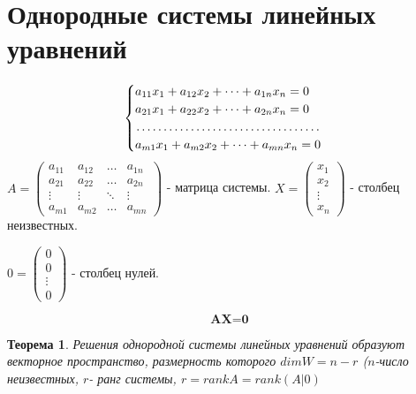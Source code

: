 \documentclass[a4paper, 12pt]{report}
\newtheorem*{theorem}{Теорема}
\begin{document}
\section{Однородные системы линейных уравнений}
\begin{equation}
    \begin{cases}
    $$a_{11}x_1+a_{12}x_2+\dots+a_{1n}x_n=0$$\\
    $$a_{21}x_1+a_{22}x_2+\dots+a_{2n}x_n=0$$\\
    \dotfill\\
    $$a_{m1}x_1+a_{m2}x_2+\dots+a_{mn}x_n=0$$
    \end{cases}
\end{equation}
 $A=
\begin{pmatrix}
a_{11} & a_{12} & \dots & a_{1n}\\
a_{21} & a_{22} & \dots & a_{2n}\\
\vdots & \vdots & \ddots & \vdots\\
a_{m1} & a_{m2} & \dots & a_{mn}
\end{pmatrix}$ - матрица системы.
$X=
\begin{pmatrix}
x_1\\
x_2\\
\vdots\\
x_n
\end{pmatrix}
$ - столбец неизвестных.\\
\begin{center}
$0=
\begin{pmatrix}
0\\
0\\
\vdots\\
0
\end{pmatrix}$ - столбец нулей.
\end{center}
$$\textbf{AX=0}$$
\begin{theorem}
    Решения однородной системы линейных уравнений образуют векторное пространство, размерность которого $dimW=n-r$ ($n$-число неизвестных, $r$- ранг системы, $r=rankA=rank(A|0)$
\end{theorem}
\end{document}
